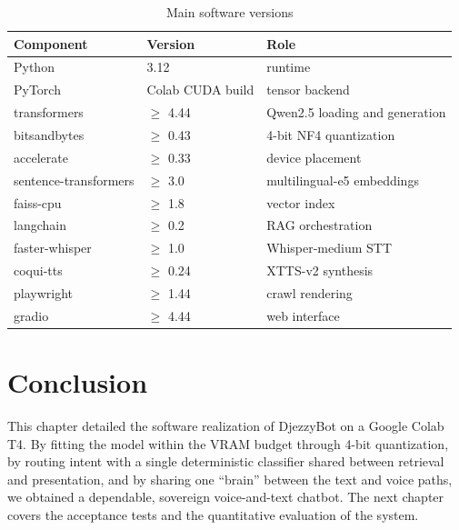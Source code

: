 \documentclass[12pt, a4paper]{report}
\newcommand{\humantext}[1]{#1}      %
\begin{document}
\begin{table}[H]
\centering
\caption{Main software versions}
\label{tab:versions}
\begin{tabularx}{\textwidth}{l l X}
\toprule
\textbf{Component} & \textbf{Version} & \textbf{Role} \\
\midrule
Python                & 3.12             & runtime \\
PyTorch               & Colab CUDA build & tensor backend \\
transformers          & $\ge$ 4.44       & Qwen2.5 loading and generation \\
bitsandbytes          & $\ge$ 0.43       & 4-bit NF4 quantization \\
accelerate            & $\ge$ 0.33       & device placement \\
sentence-transformers & $\ge$ 3.0        & multilingual-e5 embeddings \\
faiss-cpu             & $\ge$ 1.8        & vector index \\
langchain             & $\ge$ 0.2        & RAG orchestration \\
faster-whisper        & $\ge$ 1.0        & Whisper-medium STT \\
coqui-tts             & $\ge$ 0.24       & XTTS-v2 synthesis \\
playwright            & $\ge$ 1.44       & crawl rendering \\
gradio                & $\ge$ 4.44       & web interface \\
\bottomrule
\end{tabularx}
\end{table}

\section{Conclusion}
\humantext{This chapter detailed the software realization of DjezzyBot on a Google Colab T4. By fitting the model within the VRAM budget through 4-bit quantization, by routing intent with a single deterministic classifier shared between retrieval and presentation, and by sharing one ``brain'' between the text and voice paths, we obtained a dependable, sovereign voice-and-text chatbot. The next chapter covers the acceptance tests and the quantitative evaluation of the system.}


\end{document}
